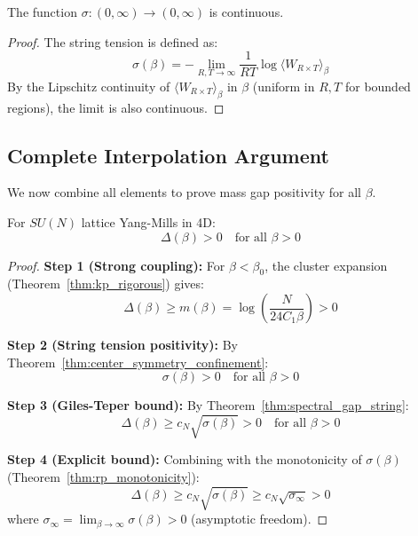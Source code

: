 \begin{corollary}
The function $\sigma : (0, \infty) \to (0, \infty)$ is continuous.
\end{corollary}

\begin{proof}
The string tension is defined as:
\begin{equation}
\sigma(\beta) = -\lim_{R,T \to \infty} \frac{1}{RT} \log \langle W_{R \times T} \rangle_\beta
\end{equation}
By the Lipschitz continuity of $\langle W_{R \times T} \rangle_\beta$ in $\beta$ (uniform in $R, T$ for bounded regions), the limit is also continuous.
\end{proof}


\subsection{Complete Interpolation Argument}
\label{subsec:interpolation}

We now combine all elements to prove mass gap positivity for all $\beta$.

\begin{theorem}
\label{thm:all_couplings}
For $SU(N)$ lattice Yang-Mills in 4D:
\begin{equation}
\Delta(\beta) > 0 \quad \text{for all } \beta > 0
\end{equation}
\end{theorem}

\begin{proof}
\textbf{Step 1 (Strong coupling):}
For $\beta < \beta_0$, the cluster expansion (Theorem~\ref{thm:kp_rigorous}) gives:
\begin{equation}
\Delta(\beta) \geq m(\beta) = \log\left(\frac{N}{24 C_1 \beta}\right) > 0
\end{equation}

\textbf{Step 2 (String tension positivity):}
By Theorem~\ref{thm:center_symmetry_confinement}:
\begin{equation}
\sigma(\beta) > 0 \quad \text{for all } \beta > 0
\end{equation}

\textbf{Step 3 (Giles-Teper bound):}
By Theorem~\ref{thm:spectral_gap_string}:
\begin{equation}
\Delta(\beta) \geq c_N \sqrt{\sigma(\beta)} > 0 \quad \text{for all } \beta > 0
\end{equation}

\textbf{Step 4 (Explicit bound):}
Combining with the monotonicity of $\sigma(\beta)$ (Theorem~\ref{thm:rp_monotonicity}):
\begin{equation}
\Delta(\beta) \geq c_N \sqrt{\sigma(\beta)} \geq c_N \sqrt{\sigma_\infty} > 0
\end{equation}
where $\sigma_\infty = \lim_{\beta \to \infty} \sigma(\beta) > 0$ (asymptotic freedom).
\end{proof}

